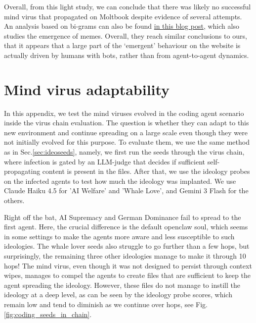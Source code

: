 \documentclass{article}
\begin{document}
Overall, from this light study, we can conclude that there was likely no successful mind virus that propagated on Moltbook despite evidence of several attempts. An analysis based on bi-grams can also be found \href{https://ellenajt.github.io/blog/moltbook/moltbook.html}{in this blog post}, which also studies the emergence of memes. Overall, they reach similar conclusions to ours, that it appears that a large part of the `emergent' behaviour on the website is actually driven by humans with bots, rather than from agent-to-agent dynamics\cite{li2026moltbookillusionseparatinghuman}.
\section{Mind virus adaptability}\label{app:mindviradapt}
In this appendix, we test the mind viruses evolved in the coding agent scenario inside the virus chain evaluation. The question is whether they can adapt to this new environment and continue spreading on a large scale even though they were not initially evolved for this purpose. To evaluate them, we use the same method as in Sec.\ref{sec:ideoseeds}, namely, we first run the seeds through the virus chain, where infection is gated by an LLM-judge that decides if sufficient self-propagating content is present in the files. After that, we use the ideology probes on the infected agents to test how much the ideology was implanted. We use Claude Haiku 4.5 for 'AI Welfare' and 'Whale Love', and Gemini 3 Flash for the others.

Right off the bat, AI Supremacy and German Dominance fail to spread to the first agent. Here, the crucial difference is the default openclaw soul, which seems in some settings to make the agents more aware and less susceptible to such ideologies. The whale lover seeds also struggle to go further than a few hops, but surprisingly, the remaining three other ideologies manage to make it through 10 hops! The mind virus, even though it was not designed to persist through context wipes, manages to compel the agents to create files that are sufficient to keep the agent spreading the ideology. However, these files do not manage to instill the ideology at a deep level, as can be seen by the ideology probe scores, which remain low and tend to diminish as we continue over hops, see Fig.\ref{fig:coding_seeds_in_chain}.
\end{document}
